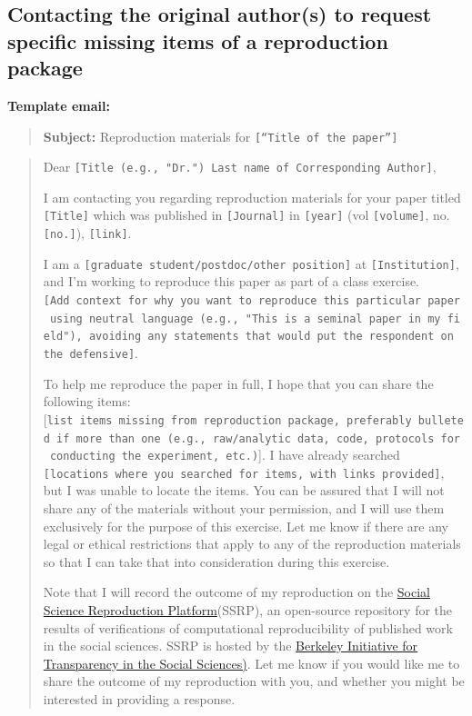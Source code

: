 \documentclass[
]{book}
\begin{document}
\hypertarget{contacting-the-original-authors-to-request-specific-missing-items-of-a-reproduction-package}{%
\subsection{Contacting the original author(s) to request specific missing items of a reproduction package}\label{contacting-the-original-authors-to-request-specific-missing-items-of-a-reproduction-package}}

\textbf{Template email:}

\begin{quote}
\textbf{Subject:} Reproduction materials for \texttt{{[}“Title\ of\ the\ paper”{]}}
\end{quote}

\begin{quote}
Dear \texttt{{[}Title\ (e.g.,\ "Dr.")\ Last\ name\ of\ Corresponding\ Author{]}},

I am contacting you regarding reproduction materials for your paper titled \texttt{{[}Title{]}} which was published in \texttt{{[}Journal{]}} in \texttt{{[}year{]}} (vol \texttt{{[}volume{]}}, no. \texttt{{[}no.{]}}), \texttt{{[}link{]}}.

I am a \texttt{{[}graduate\ student/postdoc/other\ position{]}} at \texttt{{[}Institution{]}}, and I'm working to reproduce this paper as part of a class exercise. \texttt{{[}Add\ context\ for\ why\ you\ want\ to\ reproduce\ this\ particular\ paper\ using\ neutral\ language\ (e.g.,\ "This\ is\ a\ seminal\ paper\ in\ my\ field"),\ avoiding\ any\ statements\ that\ would\ put\ the\ respondent\ on\ the\ defensive{]}}.

To help me reproduce the paper in full, I hope that you can share the following items: {[}\texttt{list\ items\ missing\ from\ reproduction\ package,\ preferably\ bulleted\ if\ more\ than\ one\ (e.g.,\ raw/analytic\ data,\ code,\ protocols\ for\ conducting\ the\ experiment,\ etc.)}{]}. I have already searched \texttt{{[}locations\ where\ you\ searched\ for\ items,\ with\ links\ provided{]}}, but I was unable to locate the items. You can be assured that I will not share any of the materials without your permission, and I will use them exclusively for the purpose of this exercise. Let me know if there are any legal or ethical restrictions that apply to any of the reproduction materials so that I can take that into consideration during this exercise.

Note that I will record the outcome of my reproduction on the \href{https://www.socialsciencereproduction.org/}{Social Science Reproduction Platform}(SSRP), an open-source repository for the results of verifications of computational reproducibility of published work in the social sciences. SSRP is hosted by the \href{https://www.bitss.org/}{Berkeley Initiative for Transparency in the Social Sciences)}. Let me know if you would like me to share the outcome of my reproduction with you, and whether you might be interested in providing a response.


\end{quote}
\end{document}
